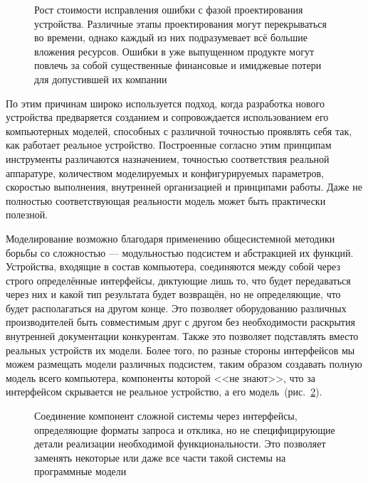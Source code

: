 \begin{figure}[htb]
    \centering
    \caption[Рост стоимости исправления ошибки с фазой проектирования устройства]{Рост стоимости исправления ошибки с фазой проектирования устройства. Различные этапы проектирования могут перекрываться во времени, однако каждый из них подразумевает всё большие вложения ресурсов. Ошибки в уже выпущенном продукте могут повлечь за собой существенные финансовые и имиджевые потери для допустившей их компании}
    \label{fig:error-cost}
\end{figure}

По этим причинам широко используется подход, когда разработка нового устройства предваряется созданием и сопровождается использованием его компьютерных моделей, способных с различной точностью проявлять себя так, как работает реальное устройство. Построенные согласно этим принципам инструменты различаются назначением, точностью соответствия реальной аппаратуре, количеством моделируемых и конфигурируемых параметров, скоростью выполнения, внутренней организацией и принципами работы. Даже не полностью соответствующая реальности модель может быть практически полезной.

\begin{digression}
Моделирование возможно благодаря применению общесистемной методики борьбы со сложностью --- модульностью подсистем и абстракцией их функций. Устройства, входящие в состав компьютера, соединяются между собой через строго определённые интерфейсы, диктующие лишь то, что будет передаваться через них и какой тип результата будет возвращён, но не определяющие, что будет располагаться на другом конце. Это позволяет оборудованию различных производителей быть совместимым друг с другом без необходимости раскрытия внутренней документации конкурентам. Также это позволяет подставлять вместо реальных устройств их модели. Более того, по разные стороны интерфейсов мы можем размещать модели различных подсистем, таким образом создавать полную модель всего компьютера, компоненты которой <<не знают>>, что за интерфейсом скрывается не реальное устройство, а его модель~(рис.~\ref{fig:interface}).

\end{digression}

\begin{figure}[htp]
\centering
{}
\caption[Соединение компонент сложной системы через интерфейсы]{Соединение компонент сложной системы через интерфейсы, определяющие форматы запроса и отклика, но не специфицирующие детали реализации необходимой функциональности. Это позволяет заменять некоторые или даже все части такой системы на программные модели}\label{fig:interface}
\end{figure}

